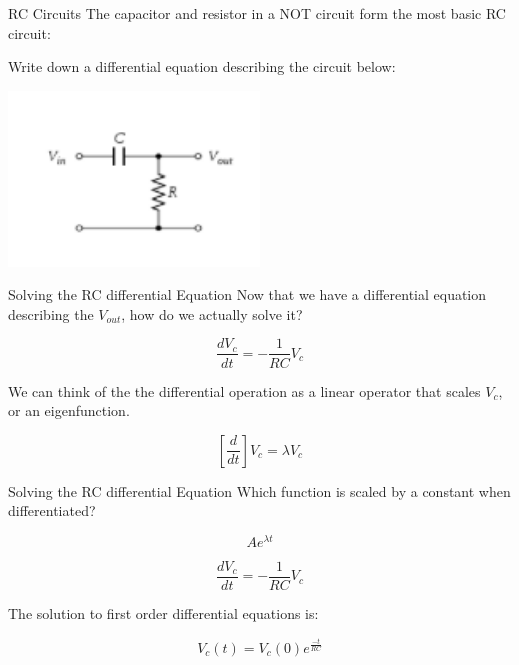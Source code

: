 \documentclass{beamer}
\begin{document}
	\begin{frame}{RC Circuits}
    	The capacitor and resistor in a NOT circuit form the most basic RC circuit:
        
        Write down a differential equation describing the circuit below:

	    \begin{center}
	        \includegraphics[width=0.5\textwidth]{rc-circuits-2.png}
	    \end{center}
	\end{frame}
	
	\begin{frame}{Solving the RC differential Equation}
    	Now that we have a differential equation describing the $V_{out}$, how do we actually solve it?
    	
    	$$\frac{dV_c}{dt} = -\frac{1}{RC}V_c$$
        
        We can think of the the differential operation as a linear operator that scales $V_c$, or an eigenfunction.

	    $$[\frac{d}{dt}]V_c = \lambda{V_c}$$
	\end{frame}
	
	\begin{frame}{Solving the RC differential Equation}
    	Which function is scaled by a constant when differentiated?
    	
    	$$Ae^{\lambda{t}}$$
    	
    	$$\frac{dV_c}{dt} = -\frac{1}{RC}V_c$$
    	
    	The solution to first order differential equations is:
    	
    	$$V_c(t) = V_c(0)e^{\frac{-t}{RC}}$$
	\end{frame}
	
\end{document}
